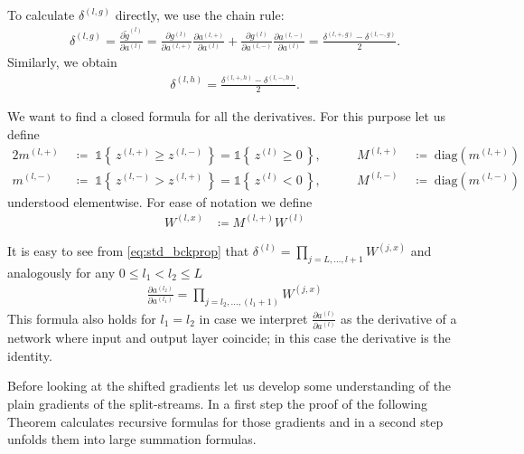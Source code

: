 To calculate $\delta^{(l, g)}$ directly, we use the chain rule:
\begin{align}
    \delta^{(l, g)}
        = \frac{\partial \tilde{g}^{(l)}}{\partial a^{(l)}} 
        = \frac{\partial g^{(l)}}{\partial a^{(l,+)}} \frac{\partial a^{(l,+)}}{\partial a^{(l)}} + \frac{\partial g^{(l)}}{\partial a^{(l,-)}} \frac{\partial a^{(l,-)}}{\partial a^{(l)}}
        = \frac{\delta^{(l,+,g)} - \delta^{(l,-,g)}}{2}.
\end{align}
Similarly, we obtain
\begin{align}
\delta^{(l, h)} = \frac{\delta^{(l,+,h)} - \delta^{(l,-,h)}}{2}.
\end{align}


We want to find a closed formula for all the derivatives. For this purpose let us define
\begin{alignat}{2}
    m^{(l,+)} &\;\coloneqq\; \mathbb{1}\!\left\{\,z^{(l,+)} \ge z^{(l,-)}\,\right\} = \mathbb{1}\!\left\{\,z^{(l)} \ge 0\,\right\},
    &\qquad M^{(l,+)} &\;\coloneqq\; \text{diag}\!\left( m^{(l,+)} \right) \\[6pt]
    m^{(l,-)} &\;\coloneqq\; \mathbb{1}\!\left\{\,z^{(l,-)} > z^{(l,+)}\,\right\} = \mathbb{1}\!\left\{\,z^{(l)} < 0\,\right\},
    &\qquad M^{(l,-)} &\;\coloneqq\; \text{diag}\!\left( m^{(l,-)} \right)
\end{alignat}
understood elementwise. For ease of notation we define
\begin{align}
    W^{(l, x)} &\coloneqq M^{(l, +)} W^{(l)}
\end{align}

It is easy to see from \cref{eq:std_bckprop} that $\delta^{(l)} = \prod_{j = L,\dots,l+1} W^{(j,x)}$ and analogously for any $0 \leq l_1 < l_2 \leq L$
\begin{align}
    \frac{\partial a^{(l_2)}}{\partial a^{(l_1)}} = \prod_{j = l_2,\dots,(l_1 + 1)} W^{(j, x)} \label{eq:general_derivative_product}
\end{align}
This formula also holds for $l_1 = l_2$ in case we interpret $\frac{\partial a^{(l)}}{\partial a^{(l)}}$ as the derivative of a network where input and output layer coincide; in this case the derivative is the identity.

Before looking at the shifted gradients let us develop some understanding of the plain gradients of the split-streams.
In a first step the proof of the following Theorem calculates recursive formulas for those gradients and in a second step unfolds them into large summation formulas.

